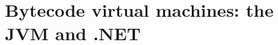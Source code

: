 \chapter{Bytecode virtual machines: the JVM and .NET}
\label{ch:bytecode-virtual-machines-the-jvm-and}

